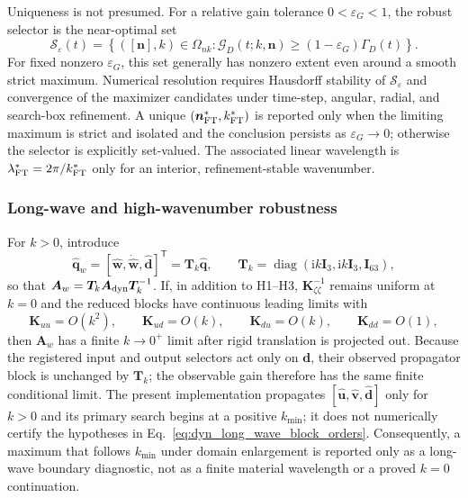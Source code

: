 Uniqueness is not presumed.  For a relative gain tolerance
$0<\varepsilon_G<1$, the robust selector is the near-optimal set
\begin{equation}
 \mathcal S_\varepsilon(t)
 =\left\{([\boldsymbol n],k)\in\Omega_{nk}:
 \mathcal G_D(t;k,\boldsymbol n)
 \ge(1-\varepsilon_G)\Gamma_D(t)\right\}.
 \label{eq:dyn_near_optimal_set}
\end{equation}
For fixed nonzero $\varepsilon_G$, this set generally has nonzero extent even
around a smooth strict maximum.  Numerical resolution requires Hausdorff
stability of $\mathcal S_\varepsilon$ and convergence of the maximizer candidates
under time-step, angular, radial, and search-box refinement.  A unique
$(\boldsymbol n_{\rm FT}^*,k_{\rm FT}^*)$ is reported only when the limiting
maximum is strict and isolated and the conclusion persists as
$\varepsilon_G\rightarrow0$; otherwise the selector is explicitly set-valued.
The associated linear wavelength is
$\lambda_{\rm FT}^*=2\pi/k_{\rm FT}^*$ only for an interior, refinement-stable
wavenumber.

\subsubsection{Long-wave and high-wavenumber robustness}

For $k>0$, introduce
\begin{equation}
 \widehat{\boldsymbol q}_w
 =[\widehat{\boldsymbol w},\dot{\widehat{\boldsymbol w}},
   \widehat{\boldsymbol d}]^{\mathsf T}
 =\boldsymbol T_k\widehat{\boldsymbol q},
 \qquad
 \boldsymbol T_k=\operatorname{diag}
 (\mathrm{i}k\boldsymbol I_3,\mathrm{i}k\boldsymbol I_3,
  \boldsymbol I_{63}),
 \label{eq:dyn_long_wave_transform}
\end{equation}
so that
$\boldsymbol A_w=\boldsymbol T_k\boldsymbol A_{\rm dyn}
\boldsymbol T_k^{-1}$.  If, in addition to H1--H3,
$\boldsymbol K_{\zeta\zeta}^{-1}$ remains uniform at $k=0$ and the reduced
blocks have continuous leading limits with
\begin{equation}
 \boldsymbol K_{uu}=O(k^2),\qquad
 \boldsymbol K_{ud}=O(k),\qquad
 \boldsymbol K_{du}=O(k),\qquad
 \boldsymbol K_{dd}=O(1),
 \label{eq:dyn_long_wave_block_orders}
\end{equation}
then $\boldsymbol A_w$ has a finite $k\rightarrow0^+$ limit after rigid
translation is projected out.  Because the registered input and output
selectors act only on $\boldsymbol d$, their observed propagator block is
unchanged by $\boldsymbol T_k$; the observable gain therefore has the same
finite conditional limit.  The present implementation propagates
$[\widehat{\boldsymbol u},\widehat{\boldsymbol v},\widehat{\boldsymbol d}]$
only for $k>0$ and its primary search begins at a positive $k_{\min}$; it does
not numerically certify the hypotheses in
Eq.~\eqref{eq:dyn_long_wave_block_orders}.  Consequently, a maximum that
follows $k_{\min}$ under domain enlargement is reported only as a long-wave
boundary diagnostic, not as a finite material wavelength or a proved
$k=0$ continuation.

